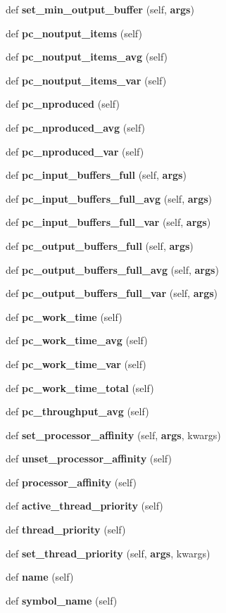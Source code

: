 \begin{DoxyCompactItemize}
\item 
def {\bf set\+\_\+min\+\_\+output\+\_\+buffer} (self, {\bf args})
\item 
def {\bf pc\+\_\+noutput\+\_\+items} (self)
\item 
def {\bf pc\+\_\+noutput\+\_\+items\+\_\+avg} (self)
\item 
def {\bf pc\+\_\+noutput\+\_\+items\+\_\+var} (self)
\item 
def {\bf pc\+\_\+nproduced} (self)
\item 
def {\bf pc\+\_\+nproduced\+\_\+avg} (self)
\item 
def {\bf pc\+\_\+nproduced\+\_\+var} (self)
\item 
def {\bf pc\+\_\+input\+\_\+buffers\+\_\+full} (self, {\bf args})
\item 
def {\bf pc\+\_\+input\+\_\+buffers\+\_\+full\+\_\+avg} (self, {\bf args})
\item 
def {\bf pc\+\_\+input\+\_\+buffers\+\_\+full\+\_\+var} (self, {\bf args})
\item 
def {\bf pc\+\_\+output\+\_\+buffers\+\_\+full} (self, {\bf args})
\item 
def {\bf pc\+\_\+output\+\_\+buffers\+\_\+full\+\_\+avg} (self, {\bf args})
\item 
def {\bf pc\+\_\+output\+\_\+buffers\+\_\+full\+\_\+var} (self, {\bf args})
\item 
def {\bf pc\+\_\+work\+\_\+time} (self)
\item 
def {\bf pc\+\_\+work\+\_\+time\+\_\+avg} (self)
\item 
def {\bf pc\+\_\+work\+\_\+time\+\_\+var} (self)
\item 
def {\bf pc\+\_\+work\+\_\+time\+\_\+total} (self)
\item 
def {\bf pc\+\_\+throughput\+\_\+avg} (self)
\item 
def {\bf set\+\_\+processor\+\_\+affinity} (self, {\bf args}, kwargs)
\item 
def {\bf unset\+\_\+processor\+\_\+affinity} (self)
\item 
def {\bf processor\+\_\+affinity} (self)
\item 
def {\bf active\+\_\+thread\+\_\+priority} (self)
\item 
def {\bf thread\+\_\+priority} (self)
\item 
def {\bf set\+\_\+thread\+\_\+priority} (self, {\bf args}, kwargs)
\item 
def {\bf name} (self)
\item 
def {\bf symbol\+\_\+name} (self)

\end{DoxyCompactItemize}
